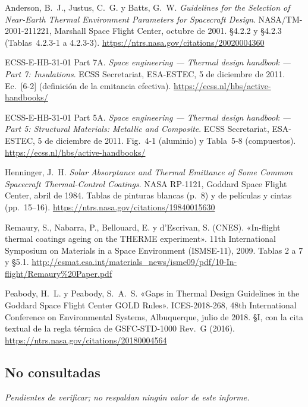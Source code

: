 \documentclass[11pt,a4paper]{article}
\begin{document}
{\begin{enumerate}[label={[\arabic*]},ref=\arabic*,leftmargin=*]
\begin{itemize}
  \end{itemize}
  \item\label{f:4} Anderson, B.~J., Justus, C.~G. y Batts, G.~W. \textit{Guidelines for the Selection of Near-Earth Thermal Environment Parameters for Spacecraft Design}. NASA/TM-2001-211221, Marshall Space Flight Center, octubre de 2001. §4.2.2 y §4.2.3 (Tablas~4.2.3-1 a 4.2.3-3). \url{https://ntrs.nasa.gov/citations/20020004360}
  \item\label{f:5} ECSS-E-HB-31-01 Part 7A. \textit{Space engineering — Thermal design handbook — Part 7: Insulations}. ECSS Secretariat, ESA-ESTEC, 5 de diciembre de 2011. Ec.~[6-2] (definición de la emitancia efectiva). \url{https://ecss.nl/hbs/active-handbooks/}
  \item\label{f:6} ECSS-E-HB-31-01 Part 5A. \textit{Space engineering — Thermal design handbook — Part 5: Structural Materials: Metallic and Composite}. ECSS Secretariat, ESA-ESTEC, 5 de diciembre de 2011. Fig.~4-1 (aluminio) y Tabla~5-8 (compuestos). \url{https://ecss.nl/hbs/active-handbooks/}
  \item\label{f:7} Henninger, J.~H. \textit{Solar Absorptance and Thermal Emittance of Some Common Spacecraft Thermal-Control Coatings}. NASA RP-1121, Goddard Space Flight Center, abril de 1984. Tablas de pinturas blancas (p.~8) y de películas y cintas (pp.~15--16). \url{https://ntrs.nasa.gov/citations/19840015630}
  \item\label{f:8} Remaury, S., Nabarra, P., Bellouard, E. y d'Escrivan, S. (CNES). «In-flight thermal coatings ageing on the THERME experiment». 11th International Symposium on Materials in a Space Environment (ISMSE-11), 2009. Tablas 2 a 7 y §5.1. \url{http://esmat.esa.int/materials_news/isme09/pdf/10-In-flight/Remaury%20Paper.pdf}
  \item\label{f:9} Peabody, H.~L. y Peabody, S.~A.~S. «Gaps in Thermal Design Guidelines in the Goddard Space Flight Center GOLD Rules». ICES-2018-268, 48th International Conference on Environmental Systems, Albuquerque, julio de 2018. §I, con la cita textual de la regla térmica de GSFC-STD-1000 Rev.~G (2016). \url{https://ntrs.nasa.gov/citations/20180004564}
\end{enumerate}
}

\subsection*{No consultadas}

\textit{Pendientes de verificar; no respaldan ningún valor de este informe.}
\end{document}
